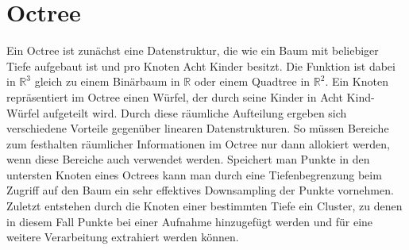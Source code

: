 \section{Octree}

Ein Octree ist zunächst eine Datenstruktur, die wie ein Baum mit beliebiger Tiefe aufgebaut ist und pro Knoten Acht Kinder besitzt. Die Funktion ist dabei in \(\mathbb{R}^3\) gleich zu einem Binärbaum in \(\mathbb{R}\) oder einem Quadtree in \(\mathbb{R}^2\). Ein Knoten repräsentiert im Octree einen Würfel, der durch seine Kinder in Acht Kind-Würfel aufgeteilt wird. Durch diese räumliche Aufteilung ergeben sich verschiedene Vorteile gegenüber linearen Datenstrukturen. So müssen Bereiche zum festhalten räumlicher Informationen im Octree nur dann allokiert werden, wenn diese Bereiche auch verwendet werden. Speichert man Punkte in den untersten Knoten eines Octrees kann man durch eine Tiefenbegrenzung beim Zugriff auf den Baum ein sehr effektives Downsampling der Punkte vornehmen. Zuletzt entstehen durch die Knoten einer bestimmten Tiefe ein Cluster, zu denen in diesem Fall Punkte bei einer Aufnahme hinzugefügt werden und für eine weitere Verarbeitung extrahiert werden können.\\